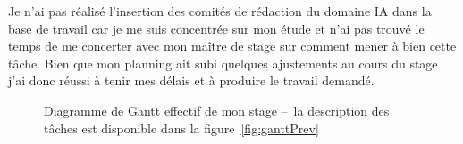 		Je n'ai pas réalisé l'insertion des comités de rédaction du domaine IA dans la base de travail car je me suis concentrée sur mon étude et n'ai pas trouvé le temps de me concerter avec mon maître de stage sur comment mener à bien cette tâche. Bien que mon planning ait subi quelques ajustements au cours du stage j'ai donc réussi à tenir mes délais et à produire le travail demandé.
	
		\begin{figure}[p]
			\centering
			
			\caption{Diagramme de Gantt effectif de mon stage --~la description des tâches est disponible dans la figure~\ref{fig:ganttPrev}}\label{fig:ganttEff}
		\end{figure}
	